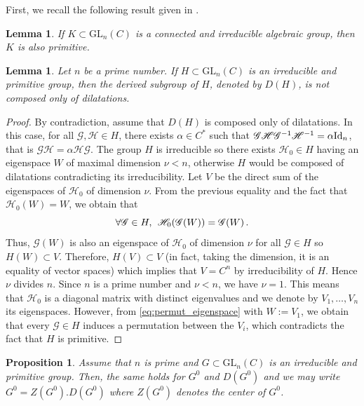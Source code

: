 \documentclass[a4paper,11pt]{amsart}
\newcommand{\GL}{\operatorname{GL}}
\newtheorem{prop}[thm]{Proposition}
\newtheorem{lem}[thm]{Lemma}
\def\GL{\mathrm{GL}}
\begin{document}
First, we recall the following result given in \cite[Lemma 4.2]{adamczewski2021hypertranscendence}.

\begin{lem}
\label{lem:connected+irred}
    If $K\subset \GL_n(C)$ is a connected and irreducible algebraic group, then $K$ is also primitive. 
\end{lem}


\begin{lem}
\label{lem:irred_primitive_G^0}
Let $n$ be a prime number. If $H\subset\GL_n(C)$ is an irreducible and primitive group, then the derived subgroup of $H$, denoted by $D(H)$, is not composed only of dilatations.
\end{lem}

\begin{proof}
By contradiction, assume that $D(H)$ is composed only of dilatations. In this case, for all $\mathscr{G},\mathscr{H}\in H$, there exists $\alpha\in C^*$ such that $\mathscr{G}\mathscr{H}\mathscr{G}^{-1}\mathscr{H}^{-1} = \alpha \textnormal{Id}_n$, that is  $\mathscr{G}\mathscr{H}=\alpha \mathscr{H}\mathscr{G}$. The group $H$ is irreducible so there exists $\mathscr{H}_0\in H$ having an eigenspace $W$ of maximal dimension $\nu<n$, otherwise $H$ would be composed of dilatations contradicting its irreducibility. Let $V$ be the direct sum of the eigenspaces of $\mathscr{H}_0$ of dimension $\nu$. From the previous equality and the fact that $\mathscr{H}_0(W)=W$, we obtain that 
\begin{equation}
    \label{eq:permut_eigenspace}
    \forall \mathscr{G}\in H,\hspace{0.15cm} \mathscr{H}_0(\mathscr{G}(W))=\mathscr{G}(W)\, .
\end{equation}
 Thus, $\mathscr{G}(W)$ is also  an eigenspace of $\mathscr{H}_0$  of dimension $\nu$ for all $\mathscr{G}\in H$ so $H(W)\subset V$. Therefore, $H(V)\subset V$ (in fact, taking the dimension, it is an equality of vector spaces) which implies that $V=C^n$ by irreducibility of $H$. Hence  $\nu$ divides $n$. Since $n$ is a prime number and $\nu<n$, we have $\nu=1$. This means that $\mathscr{H}_0$ is a diagonal matrix with distinct eigenvalues and we denote by $V_1,\ldots,V_n$ its eigenspaces. However, from \eqref{eq:permut_eigenspace} with $W:=V_1$, we obtain that every $\mathscr{G}\in H$ induces a permutation between the $V_i$, which contradicts the fact that $H$ is primitive.
\end{proof}


\begin{prop}\label{prop4}
    Assume that $n$ is prime and $G \subset \mathrm{GL}_n (C)$ is an irreducible and primitive group. Then, the same holds for $G^0$ and $D(G^0)$ and we may write $G^0=Z(G^0).D(G^0)$ where $Z(G^0)$ denotes the center of $G^0$.
\end{prop}
\end{document}
